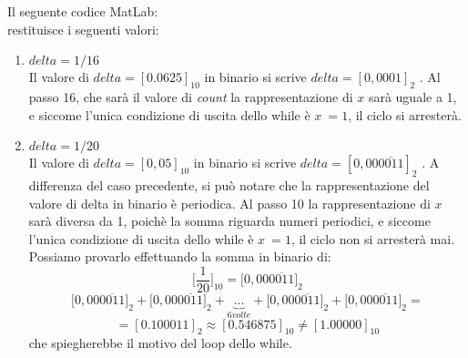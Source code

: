 Il seguente codice MatLab:\\

restituisce i seguenti valori:\\
\begin{enumerate}
\item $delta = 1/16$\\
Il valore di $delta=[0.0625]_{10}$ in binario si scrive $delta=[0,0001]_2$ . Al passo 16, che sarà il valore di \textit{count} la rappresentazione di $x$ sarà uguale a 1, e siccome l'unica condizione di uscita dello while è $x~=1$, il ciclo si arresterà.
\\
\item $delta = 1/20$\\
Il valore di $delta=[0,05]_{10}$ in binario si scrive $delta=[0,00\overline{0011}]_2$ . A differenza del caso precedente, si può notare che la rappresentazione del valore di delta in binario è periodica. Al passo 10 la rappresentazione di $x$ sarà diversa da 1, poichè la somma riguarda numeri periodici, e siccome l'unica condizione di uscita dello while è $x~=1$, il ciclo non si arresterà mai.\\
Possiamo provarlo effettuando la somma in binario di:
\[
\Big[\frac{1}{20}\Big]_{10}=\Big[0,00\overline{0011}\Big]_2
\]
\[
\Big[0,00\overline{0011}\Big]_2+\Big[0,00\overline{0011}\Big]_2+ \underbrace{...}_{6 volte}+\Big[0,00\overline{0011}\Big]_2+\Big[0,00\overline{0011}\Big]_2 = 
\]
\[
= [0.100011]_2 \approx [0.546875]_{10} \neq [1.00000]_{10}
\]
che spiegherebbe il motivo del loop dello while.
\end{enumerate}